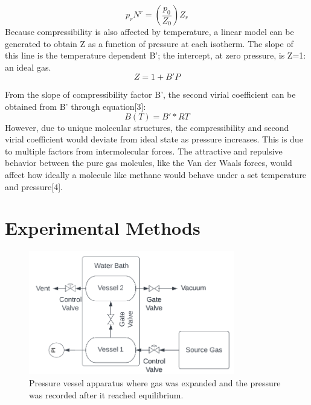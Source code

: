\documentclass{article}
\begin{document}
\begin{equation} \label{eq:2} 
p_{r}N^{r} = \left(\frac{p_{0}}{Z_{0}}\right)Z_{r}
\end{equation}
Because compressibility is also affected by temperature, a linear model can be generated to obtain Z as a function of pressure at each isotherm. The slope of this line is the temperature dependent B'; the intercept, at zero pressure, is Z=1: an ideal gas.
\begin{equation} \label{eq:3} Z=1+B'P \end{equation}

\noindent From the slope of compressibility factor B', the second virial coefficient can be obtained from B' through equation[3]: 
\begin{equation} \label{eq:4} B(T) = B'* RT \end{equation}
However, due to unique  molecular structures, the compressibility and second virial coefficient would deviate from ideal state as pressure increases. This is due to multiple factors from intermolecular forces. The attractive and repulsive behavior between the pure gas molcules, like the Van der Waals forces, would affect how ideally a molecule like methane would behave under a set temperature and pressure[4].    

\section*{Experimental Methods}

\begin{figure}[H] \centering
\includegraphics[width=0.8\textwidth]{images/APPARATUS.PNG}
\caption{\label{fig1} Pressure vessel apparatus where gas was expanded and the pressure was recorded after it reached equilibrium.}\end{figure}
\end{document}
